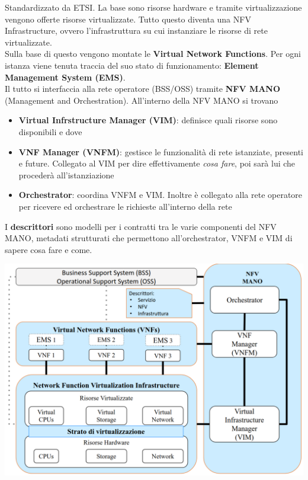 Standardizzato da ETSI. La base sono risorse hardware e tramite virtualizzazione vengono offerte risorse virtualizzate. Tutto questo diventa una NFV Infrastructure, ovvero l'infrastruttura su cui instanziare le risorse di rete virtualizzate.\\

Sulla base di questo vengono montate le \textbf{Virtual Network Functions}. Per ogni istanza viene tenuta traccia del suo stato di funzionamento: \textbf{Element Management System (EMS)}.\\

Il tutto si interfaccia alla rete operatore (BSS/OSS) tramite \textbf{NFV MANO} (Management and Orchestration). All'interno della NFV MANO si trovano
\begin{itemize}
	\item \textbf{Virtual Infrstructure Manager (VIM)}: definisce quali risorse sono disponibili e dove
	\item \textbf{VNF Manager (VNFM)}: gestisce le funzionalità di rete istanziate, presenti e future. Collegato al VIM per dire effettivamente \textit{cosa fare}, poi sarà lui che procederà all'istanziazione
	\item \textbf{Orchestrator}: coordina VNFM e VIM. Inoltre è collegato alla rete operatore per ricevere ed orchestrare le richieste all'interno della rete
\end{itemize}

I \textbf{descrittori} sono modelli per i contratti tra le varie componenti del NFV MANO, metadati strutturati che permettono all'orchestrator, VNFM e VIM di sapere cosa fare e come.

\begin{center}
	\includegraphics[width=0.8\linewidth]{img/5g/nfv1}
\end{center}

